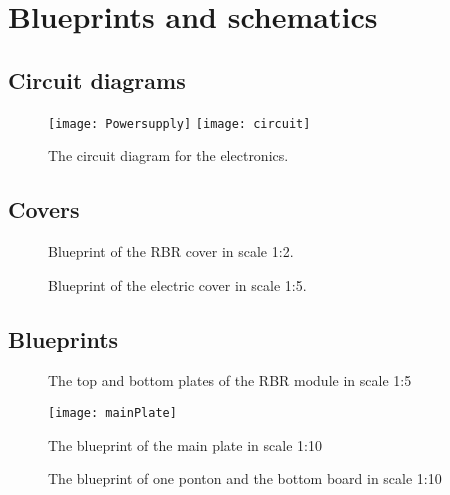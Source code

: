 \clearpage
\section{Blueprints and schematics}\label{sec:appendix-b}
\subsection{Circuit diagrams}
\begin{figure}[H]
  \centering
  \texttt{[image: Powersupply]}
  \texttt{[image: circuit]}
  \caption{The circuit diagram for the electronics.}
  \label{fig:appendix-circuit-diagrams}
\end{figure}

\clearpage
\subsection{Covers}
\begin{figure}[H]
  \centering
  \caption{Blueprint of the RBR cover in scale 1:2.}
  \label{fig:appendix-blueprint-rbr-cover}
\end{figure}

\begin{figure}[H]
  \centering
  \caption{Blueprint of the electric cover in scale 1:5.}
  \label{fig:appendix-blueprint-electronic-cover}
\end{figure}

\clearpage
\subsection{Blueprints}
\begin{figure}[H]
  \centering
  \caption{The top and bottom plates of the RBR module in scale 1:5}
  \label{fig:appendix-blueprint-rbr-module}
\end{figure}

\begin{figure}[H]
    \centering
    \texttt{[image: mainPlate]}
    \caption{The blueprint of the main plate in scale 1:10}
    \label{fig:appendix-blueprint-main-plate}
\end{figure}

\begin{figure}[H]
    \centering
    \caption{The blueprint of one ponton and the bottom board in scale 1:10}
    \label{fig:appendix-blueprint-ponton}
\end{figure}

